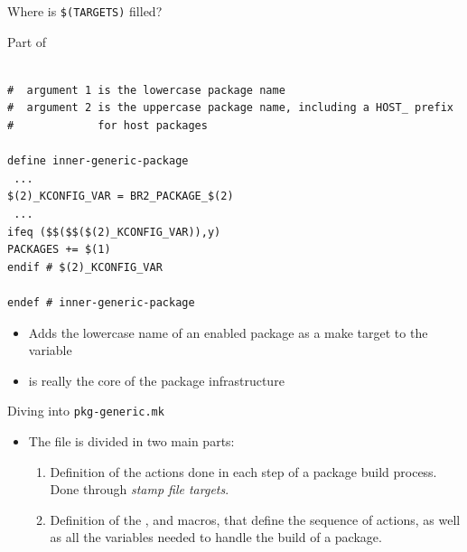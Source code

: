 \begin{frame}[fragile]{Where is {\tt \$(TARGETS)} filled?}

\begin{block}{Part of }
\begin{verbatim}

#  argument 1 is the lowercase package name
#  argument 2 is the uppercase package name, including a HOST_ prefix
#             for host packages

define inner-generic-package
 ...
$(2)_KCONFIG_VAR = BR2_PACKAGE_$(2)
 ...
ifeq ($$($$($(2)_KCONFIG_VAR)),y)
PACKAGES += $(1)
endif # $(2)_KCONFIG_VAR

endef # inner-generic-package
\end{verbatim}
\end{block}

\begin{itemize}
\item Adds the lowercase name of an enabled package as a make target
  to the  variable
\item {} is really the core of the package
  infrastructure
\end{itemize}

\end{frame}

\begin{frame}{Diving into {\tt pkg-generic.mk}}

\begin{itemize}
\item The  file is divided in two main
  parts:
  \begin{enumerate}
  \item Definition of the actions done in each step of a package build
    process. Done through {\em stamp file targets}.
  \item Definition of the ,
     and  macros,
    that define the sequence of actions, as well as all the variables
    needed to handle the build of a package.
  \end{enumerate}
\end{itemize}

\end{frame}

